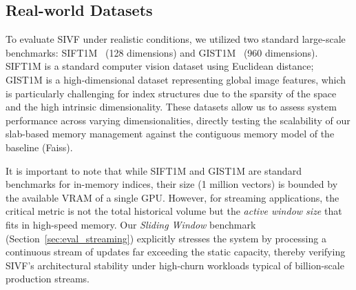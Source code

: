 \documentclass[sigconf,nonacm]{acmart}
\theoremstyle{plain}
\theoremstyle{definition}
\theoremstyle{remark}
\begin{document}
\subsection{Real-world Datasets}
\label{sec:eval_real_world}

To evaluate SIVF under realistic conditions, we utilized two standard large-scale benchmarks: SIFT1M~\cite{jegou2011product} (128 dimensions) and GIST1M~\cite{jegou2011product} (960 dimensions). SIFT1M is a standard computer vision dataset using Euclidean distance; GIST1M is a high-dimensional dataset representing global image features, which is particularly challenging for index structures due to the sparsity of the space and the high intrinsic dimensionality. These datasets allow us to assess system performance across varying dimensionalities, directly testing the scalability of our slab-based memory management against the contiguous memory model of the baseline (Faiss).

It is important to note that while SIFT1M and GIST1M are standard benchmarks for in-memory indices, their size (1 million vectors) is bounded by the available VRAM of a single GPU. However, for streaming applications, the critical metric is not the total historical volume but the \textit{active window size} that fits in high-speed memory. Our \textit{Sliding Window} benchmark (Section~\ref{sec:eval_streaming}) explicitly stresses the system by processing a continuous stream of updates far exceeding the static capacity, thereby verifying SIVF's architectural stability under high-churn workloads typical of billion-scale production streams.
\end{document}
